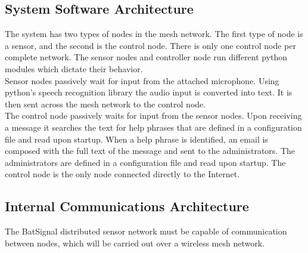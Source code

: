 \documentclass[11pt,a4paper]{article}
\begin{document}
\subsection{System Software Architecture}
The system has two types of nodes in the mesh network.  The first type of node is a sensor, and the second is the control node.  There is only one control node per complete network.  The sensor nodes and controller node run different python modules which dictate their behavior. \\
Sensor nodes passively wait for input from the attached microphone.  Using python's speech recognition library the audio input is converted into text.  It is then sent across the mesh network to the control node. \\
The control node passively waits for input from the sensor nodes. Upon receiving a message it searches the text for help phrases that are defined in a configuration file and read upon startup. When a help phrase is identified, an email is composed with the full text of the message and sent to the administrators.  The administrators are defined in a configuration file and read upon startup.  The control node is the only node connected directly to the Internet.


\subsection{Internal Communications Architecture}
The BatSignal distributed sensor network must be capable of communication between nodes, which will be carried out over a wireless mesh network. 
\end{document}
